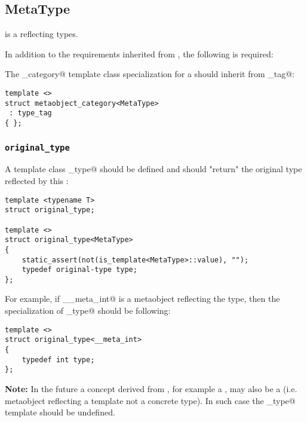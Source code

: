 \subsection{MetaType}
\label{concept-MetaType}

 is a  reflecting types.

In addition to the requirements inherited from , the following is required:

The \verb@metaobject_category@ template class specialization for a  should
inherit from \verb@type_tag@:

\begin{verbatim}
template <>
struct metaobject_category<MetaType>
 : type_tag
{ };
\end{verbatim}

\subsubsection{\texttt{original\_type}}

A template class \verb@original_type@ should be defined and should "return"
the original type reflected by this :

\begin{verbatim}
template <typename T>
struct original_type;

template <>
struct original_type<MetaType>
{
	static_assert(not(is_template<MetaType>::value), "");
	typedef original-type type;
};
\end{verbatim}

For example, if \verb@__meta_int@ is a metaobject reflecting the \verb@int@ type,
then the specialization of \verb@original_type@ should be following:

\begin{verbatim}
template <>
struct original_type<__meta_int>
{
	typedef int type;
};
\end{verbatim}

\textbf{Note:} In the future a concept derived from , for example a ,
may also be a  (i.e. metaobject reflecting a template not a concrete type).
In such case the \verb@original_type@ template should be undefined.

